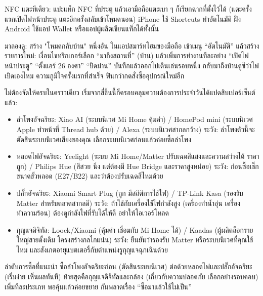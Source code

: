 NFC แตะทีเดียว: แปะแท็ก NFC ที่ประตู แล้วเอามือถือแตะเบา ๆ ก็เรียกฉากที่ตั้งไว้ได้ (แตะครั้งแรกเปิดไฟหน้าประตู แตะอีกครั้งสลับเข้าโหมดนอน) iPhone ใช้ Shortcuts ทำอัตโนมัติ ฝั่ง Android ใช้แอป Wallet หรือแอปผู้ผลิตเขียนแท็กได้ทั้งนั้น

\begin{tcbpractice}{มาลองดู: สร้าง "โหมดกลับบ้าน" หนึ่งอัน}
ในแอปสมาร์ทโฮมของมือถือ เข้าเมนู “อัตโนมัติ” แล้วสร้างรายการใหม่: เงื่อนไขทริกเกอร์เลือก “มาถึงสถานที่” (บ้าน) แล้วเพิ่มการทำงานทีละอย่าง “เปิดไฟหน้าประตู” “ตั้งแอร์ 26 องศา” “ปิดม่าน” บันทึกแล้วออกไปเดินเล่นรอบหนึ่ง กลับมาถึงบ้านดูซิว่าไฟเปิดเองไหม ความภูมิใจครั้งแรกที่สำเร็จ ฟินกว่ากดสั่งซื้ออุปกรณ์ใหม่อีก

\end{tcbpractice}


ไม่ต้องจัดให้ครบในคราวเดียว เริ่มจากสี่ชิ้นนี้ก็ครอบคลุมความต้องการประจำวันได้แปดสิบเปอร์เซ็นต์แล้ว:

\begin{itemize}
  \item ลำโพงอัจฉริยะ: Xiao AI (ระบบนิเวศ Mi Home คุ้มค่า) / HomePod mini (ระบบนิเวศ Apple ทำหน้าที่ Thread hub ด้วย) / Alexa (ระบบนิเวศสากลกว้าง) ระวัง: ลำโพงตัวนี้จะตัดสินระบบนิเวศเสียงของคุณ เลือกระบบนิเวศก่อนแล้วค่อยซื้อลำโพง
  \item หลอดไฟอัจฉริยะ: Yeelight (ระบบ Mi Home/Matter ปรับเฉดสีแสงและความสว่างได้ ราคาถูก) / Philips Hue (สีสวย นิ่ง แต่ต้องมี Hue Bridge และราคาสูงหน่อย) ระวัง: ก่อนซื้อเช็กขนาดขั้วหลอด (E27/B22) และว่าต้องปรับเฉดสีไหมด้วย
  \item ปลั๊กอัจฉริยะ: Xiaomi Smart Plug (ถูก มีสถิติการใช้ไฟ) / TP-Link Kasa (รองรับ Matter สำหรับตลาดสากลดี) ระวัง: ถ้าใช้กับเครื่องใช้ไฟกำลังสูง (เครื่องทำน้ำอุ่น เครื่องทำความร้อน) ต้องดูกำลังไฟที่รับได้ให้ดี อย่าให้โอเวอร์โหลด
  \item กุญแจดิจิทัล: Loock/Xiaomi (คุ้มค่า เชื่อมกับ Mi Home ได้) / Kaadas (ผู้ผลิตล็อกรายใหญ่สายดั้งเดิม โครงสร้างกลไกแน่น) ระวัง: ยืนยันว่ารองรับ Matter หรือระบบนิเวศที่คุณใช้ไหม และสังเกตอายุแบตเตอรี่กับตำแหน่งรูกุญแจฉุกเฉินด้วย
\end{itemize}

\begin{tcbinfo}{ลำดับการซื้อที่แนะนำ}
ซื้อลำโพงอัจฉริยะก่อน (ตัดสินระบบนิเวศ) ต่อด้วยหลอดไฟและปลั๊กอัจฉริยะ (เริ่มง่าย เห็นผลทันที) ท้ายสุดคือกุญแจดิจิทัลและกล้อง (เกี่ยวกับความปลอดภัย เลือกอย่างรอบคอบ) เพิ่มทีละประเภท พอคุ้นแล้วค่อยขยาย กันพลาดเรื่อง “ซื้อมาแล้วใช้ไม่เป็น”

\end{tcbinfo}

